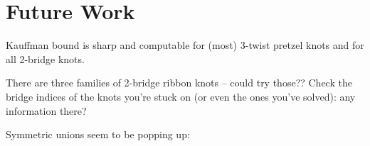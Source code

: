 \chapter{Future Work}

Kauffman bound is sharp and computable for (most) 3-twist pretzel knots and for all 2-bridge knots. 

There are three families of 2-bridge ribbon knots -- could try those??
Check the bridge indices of the knots you're stuck on (or even the ones you've solved):  any information there?

Symmetric unions seem to be popping up:

